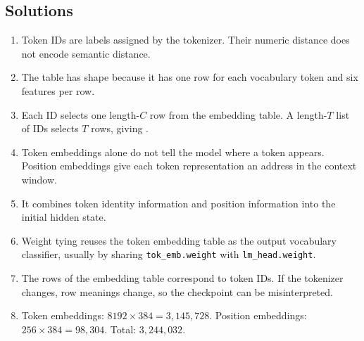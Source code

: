 \subsection*{Solutions}

\begin{enumerate}
  \item Token IDs are labels assigned by the tokenizer. Their numeric distance does not encode semantic distance.
  \item The table has shape \shape{[9,6]} because it has one row for each vocabulary token and six features per row.
  \item Each ID selects one length-\(C\) row from the embedding table. A length-\(T\) list of IDs selects \(T\) rows, giving \shape{[T,C]}.
  \item Token embeddings alone do not tell the model where a token appears. Position embeddings give each token representation an address in the context window.
  \item It combines token identity information and position information into the initial hidden state.
  \item Weight tying reuses the token embedding table as the output vocabulary classifier, usually by sharing \texttt{tok\_emb.weight} with \texttt{lm\_head.weight}.
  \item The rows of the embedding table correspond to token IDs. If the tokenizer changes, row meanings change, so the checkpoint can be misinterpreted.
  \item Token embeddings: \(8192\times384=3{,}145{,}728\). Position embeddings: \(256\times384=98{,}304\). Total: \(3{,}244{,}032\).
\end{enumerate}
